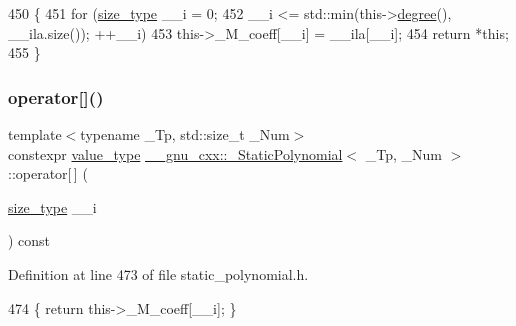\begin{DoxyCode}
450       \{
451         \textcolor{keywordflow}{for} (\hyperlink{class____gnu__cxx_1_1__StaticPolynomial_a3384ce6a956ad398fc995e6ee53b2b18}{size\_type} \_\_i = 0;
452              \_\_i <= std::min(this->\hyperlink{class____gnu__cxx_1_1__StaticPolynomial_a56b1719601ce049e6dd768e10edfd171}{degree}(), \_\_ila.size()); ++\_\_i)
453           this->\_M\_coeff[\_\_i] = \_\_ila[\_\_i];
454         \textcolor{keywordflow}{return} *\textcolor{keyword}{this};
455       \}
\end{DoxyCode}
\mbox{\label{class____gnu__cxx_1_1__StaticPolynomial_a31a019f1df24c13ecce59b05b96f409f}} 
\subsubsection{\texorpdfstring{operator[]()}{operator[]()}\hspace{0.1cm}{\footnotesize\ttfamily [1/2]}}
{\footnotesize\ttfamily template$<$typename \+\_\+\+Tp, std\+::size\+\_\+t \+\_\+\+Num$>$ \\
constexpr \hyperlink{class____gnu__cxx_1_1__StaticPolynomial_af23110f5a002cd6caa3542df7cf35284}{value\+\_\+type} \hyperlink{class____gnu__cxx_1_1__StaticPolynomial}{\+\_\+\+\_\+gnu\+\_\+cxx\+::\+\_\+\+Static\+Polynomial}$<$ \+\_\+\+Tp, \+\_\+\+Num $>$\+::operator\mbox{[}$\,$\mbox{]} (\begin{DoxyParamCaption}\item[{\hyperlink{class____gnu__cxx_1_1__StaticPolynomial_a3384ce6a956ad398fc995e6ee53b2b18}{size\+\_\+type}}]{\+\_\+\+\_\+i }\end{DoxyParamCaption}) const\hspace{0.3cm}{\ttfamily [inline]}}



Definition at line 473 of file static\+\_\+polynomial.\+h.


\begin{DoxyCode}
474       \{ \textcolor{keywordflow}{return} this->\_M\_coeff[\_\_i]; \}
\end{DoxyCode}
\mbox{\label{class____gnu__cxx_1_1__StaticPolynomial_a7f109a6648a8b21a596ed3433b57e76c}} 
